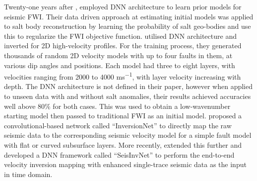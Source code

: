 Twenty-one years after \citet{Michaels1992}, \cite{Lewis2017} employed DNN architecture to learn prior models for seismic FWI. Their data driven approach at estimating initial models was applied to salt body reconstruction by learning the probability of salt geo-bodies and use this to regularize the FWI objective function. \citet{Araya-Polo2018} utilised DNN architecture and inverted for 2D high-velocity profiles. For the training process, they generated thousands of random 2D velocity models with up to four faults in them, at various dip angles and positions. Each model had three to eight layers, with velocities ranging from 2000 to 4000 \si{ms^{-1}}, with layer velocity increasing with depth. The DNN architecture is not defined in their paper, however when applied to unseen data with and without salt anomalies, their results achieved accuracies well above 80\% for both cases. This was used to obtain a low-wavenumber starting model then passed to traditional FWI as an initial model. \cite{Wu2018} proposed a convolutional-based network called ``InversionNet'' to directly map the raw seismic data to the corresponding seismic velocity model for a simple fault model with flat or curved subsurface layers. More recently, \cite{Li2019} extended this further and developed a DNN framework called ``SeisInvNet'' to perform the end-to-end velocity inversion mapping with enhanced single-trace seismic data as the input in time domain. 

